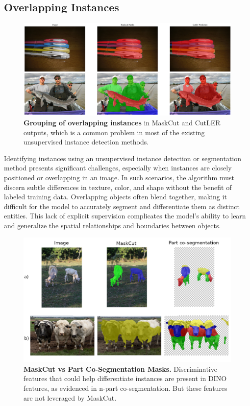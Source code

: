 \subsection{Overlapping Instances}

\begin{figure}
	\centering
	\includegraphics[width=1\textwidth]{Images/main/cutler-prob-overlap.png}
	\caption[\textbf{Cutler's Performance on Images with Overlapping Instances}]{\textbf{Grouping of overlapping instances} in MaskCut and CutLER outputs, which is a common problem in most of the existing unsupervised instance detection methods.}
	\label{fig:cutler_overlapping_instances_eg}
\end{figure}

Identifying instances using an unsupervised instance detection or segmentation method presents significant challenges, especially when instances are closely positioned or overlapping in an image. In such scenarios, the algorithm must discern subtle differences in texture, color, and shape without the benefit of labeled training data. Overlapping objects often blend together, making it difficult for the model to accurately segment and differentiate them as distinct entities. This lack of explicit supervision complicates the model's ability to learn and generalize the spatial relationships and boundaries between objects.

\begin{figure}
	\centering
	\includegraphics[width=1\textwidth]{Images/main/part-cosegm.png}
	\caption[\textbf{MaskCut vs Part Co-Segmentation Masks}]{\textbf{MaskCut vs Part Co-Segmentation Masks.} Discriminative features that could help differentiate instances are present in DINO features, as evidenced in n-part co-segmentation. But these features are not leveraged by MaskCut. }
	\label{fig:maskcut-instance-indifference}
\end{figure}

